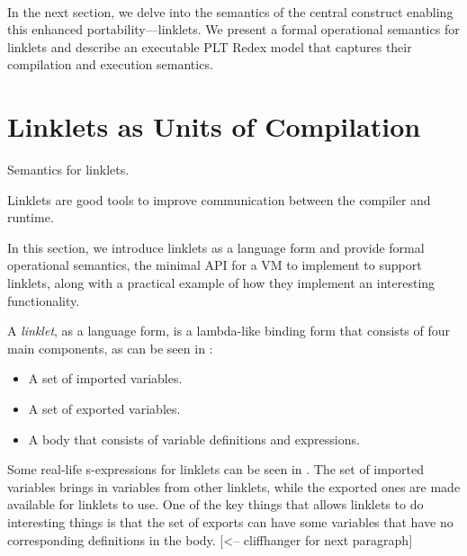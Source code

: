 		\paragraph{}%
			In the next section, we delve into the semantics of the central construct enabling this enhanced portability—linklets. We present a formal operational semantics for linklets and describe an executable PLT Redex model that captures their compilation and execution semantics.


	\section[\texorpdfstring{Linklets as Units of Compilation}{Semantics for Linklets}]{Linklets as Units of Compilation}
		\label{section:linklet-semantics}

		\begin{mainpoint}
			Semantics for linklets.

			Linklets are good tools to improve communication between the compiler and runtime.
		\end{mainpoint}

		\begin{paragraph-here}
			In this section, we introduce linklets as a language form and provide formal operational semantics, the minimal API for a VM to implement to support linklets, along with a practical example of how they implement an interesting functionality.
		\end{paragraph-here}


		\begin{paragraph-here}
			A \emph{linklet}, as a language form, is a lambda-like binding form that consists of four main components, as can be seen in :

			\begin{itemize}
				\item A set of imported variables.
				\item A set of exported variables.
				\item A body that consists of variable definitions and expressions.
			\end{itemize}

			Some real-life s-expressions for linklets can be seen in . The set of imported variables brings in variables from other linklets, while the exported ones are made available for linklets to use. One of the key things that allows linklets to do interesting things is that the set of exports can have some variables that have no corresponding definitions in the body. [<-- cliffhanger for next paragraph]
		\end{paragraph-here}

